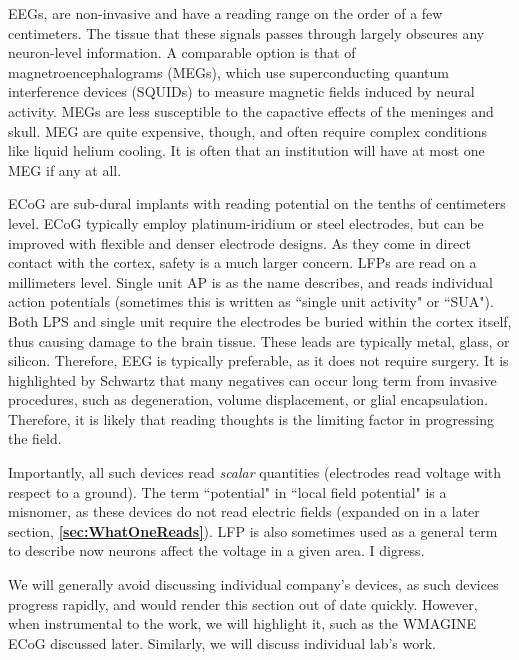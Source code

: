 EEGs, are non-invasive and have a reading range on the order of a few centimeters. The tissue that these signals passes through largely obscures any neuron-level information. A comparable option is that of magnetroencephalograms (MEGs), which use superconducting quantum interference devices (SQUIDs) to measure magnetic fields induced by neural activity. MEGs are less susceptible to the capactive effects of the meninges and skull. MEG are quite expensive, though, and often require complex conditions like liquid helium cooling. It is often that an institution will have at most one MEG if any at all.\newline

ECoG are sub-dural implants with reading potential on the tenths of centimeters level. ECoG typically employ platinum-iridium or steel electrodes, but can be improved with flexible and denser electrode designs. As they come in direct contact with the cortex, safety is a much larger concern. LFPs are read on a millimeters level. Single unit AP is as the name describes, and reads individual action potentials (sometimes this is written as ``single unit activity" or ``SUA"). Both LPS and single unit require the electrodes be buried within the cortex itself, thus causing damage to the brain tissue. These leads are typically metal, glass, or silicon. Therefore, EEG is typically preferable, as it does not require surgery. It is highlighted by Schwartz that many negatives can occur long term from invasive procedures, such as degeneration, volume displacement, or glial encapsulation. Therefore, it is likely that reading thoughts is the limiting factor in progressing the field. \newline

Importantly, all such devices read \textit{scalar} quantities (electrodes read voltage with respect to a ground). The term ``potential" in ``local field potential" is a misnomer, as these devices do not read electric fields (expanded on in a later section, \textbf{\ref{sec:WhatOneReads}}). LFP is also sometimes used as a general term to describe now neurons affect the voltage in a given area. I digress.\newline

We will generally avoid discussing individual company's devices, as such devices progress rapidly, and would render this section out of date quickly. However, when instrumental to the work, we will highlight it, such as the WMAGINE ECoG discussed later. Similarly, we will discuss individual lab's work. 


